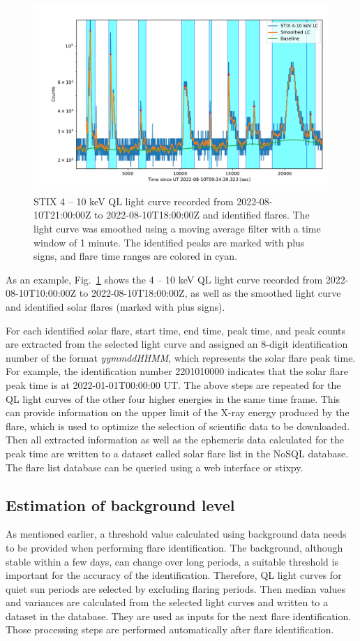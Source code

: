 \documentclass[referee]{aa} %
\begin{document}
\begin{figure}
  \centering
  \includegraphics[width=0.8\linewidth]{figures/flaredet.pdf}
  \caption{STIX 4 -- 10 keV QL light curve recorded from 2022-08-10T21:00:00Z to 2022-08-10T18:00:00Z and 
  identified flares.   
  The light curve was smoothed using a moving average filter with a time window
  of 1 minute. 
  The identified peaks are marked with plus signs, and flare time ranges are colored in cyan.
  }
  \label{fig:flare-det}
\end{figure}
As an example, Fig.~\ref{fig:flare-det} shows  the 4 -- 10 keV QL  light curve recorded from 
2022-08-10T10:00:00Z to 2022-08-10T18:00:00Z,
 as well as the smoothed light curve and identified solar flares (marked with plus signs).

For each identified solar flare,  start time, end time, peak time, and peak 
counts are extracted from the selected light curve and assigned 
an 8-digit identification number of the format {\it yymmddHHMM}, which represents the solar flare peak time. 
For example, the identification number 2201010000  indicates that 
the solar flare peak time is at 2022-01-01T00:00:00 UT. 
The above steps are repeated for the QL light curves of the other four higher energies
in the same time frame. This can provide information on the upper limit of the X-ray energy produced by the flare,
which is used to optimize the selection of scientific data to be downloaded. 
Then all extracted information as well as the ephemeris data calculated for the peak time are 
written to a dataset called solar flare list in the NoSQL database.
The flare list database can be queried using a web interface or stixpy.
\subsection{Estimation of background level}
As mentioned earlier, a threshold value calculated using background data needs to be provided when
performing flare identification.  
The background, although stable within a few days, can change over long periods,
 a suitable threshold is important for the accuracy of the identification. 
 Therefore, QL light curves for quiet sun periods are selected by excluding flaring periods. 
 Then median values and variances are calculated from the selected light curves and 
 written to a dataset in the database. They are used as inputs for the next flare identification. 
 Those processing steps are performed automatically after flare identification.
\end{document}
